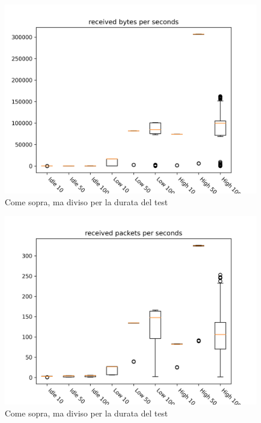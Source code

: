 \documentclass[target=bach]{thud}
\begin{document}
\begin{figure}[H]
    \includegraphics[width=\linewidth, height=0.4\textheight, keepaspectratio]{graphs/received bytes per seconds.png}
    \caption{Come sopra, ma diviso per la durata del test}
    \label{fig:rbps}
\end{figure}

\begin{figure}[H]
    \includegraphics[width=\linewidth, height=0.4\textheight, keepaspectratio]{graphs/received packets per seconds.png}
    \caption{Come sopra, ma diviso per la durata del test}
    \label{fig:rpps}
\end{figure}
\end{document}
